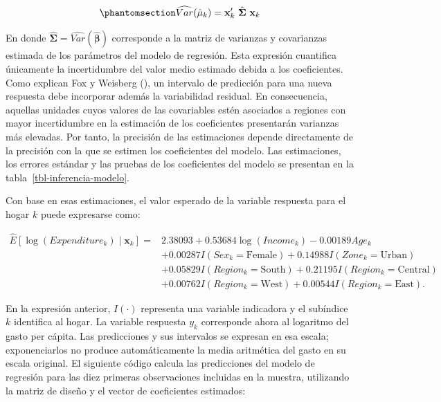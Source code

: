 \documentclass[
  spanish,
  11pt,
  letterpaper,
  oneside,
  open=any]{scrbook}
\begin{document}
\begin{equation}\protect\phantomsection\label{eq-varianza-media-condicional}{
\widehat{Var}(\hat \mu_k) =
\mathbf{x}'_{k}\ \hat{\boldsymbol{\Sigma}}\ \mathbf{x}_{k}
}\end{equation}

En donde
\(\hat{\boldsymbol{\Sigma}}=\widehat{Var}(\hat{\boldsymbol{\beta}})\)
corresponde a la matriz de varianzas y covarianzas estimada de los
parámetros del modelo de regresión. Esta expresión cuantifica únicamente
la incertidumbre del valor medio estimado debida a los coeficientes.
Como explican Fox y Weisberg (), un
intervalo de predicción para una nueva respuesta debe incorporar además
la variabilidad residual. En consecuencia, aquellas unidades cuyos
valores de las covariables estén asociados a regiones con mayor
incertidumbre en la estimación de los coeficientes presentarán varianzas
más elevadas. Por tanto, la precisión de las estimaciones depende
directamente de la precisión con la que se estimen los coeficientes del
modelo. Las estimaciones, los errores estándar y las pruebas de los
coeficientes del modelo se presentan en la
tabla~\ref{tbl-inferencia-modelo}.

Con base en esas estimaciones, el valor esperado de la variable
respuesta para el hogar \(k\) puede expresarse como:

\[
\begin{aligned}
\widehat{E}[\log(Expenditure_k)\mid\mathbf{x}_k]
={}&2.38093+0.53684\log(Income_k)-0.00189 Age_k\\
&+0.00287 I(Sex_k=\mathrm{Female})
+0.14988 I(Zone_k=\mathrm{Urban})\\
&+0.05829 I(Region_k=\mathrm{South})
+0.21195 I(Region_k=\mathrm{Central})\\
&+0.00762 I(Region_k=\mathrm{West})
+0.00544 I(Region_k=\mathrm{East}).
\end{aligned}
\]

En la expresión anterior, \(I(\cdot)\) representa una variable
indicadora y el subíndice \(k\) identifica al hogar. La variable
respuesta \(y_k\) corresponde ahora al logaritmo del gasto per cápita.
Las predicciones y sus intervalos se expresan en esa escala;
exponenciarlos no produce automáticamente la media aritmética del gasto
en su escala original. El siguiente código calcula las predicciones del
modelo de regresión para las diez primeras observaciones incluidas en la
muestra, utilizando la matriz de diseño y el vector de coeficientes
estimados:
\end{document}
